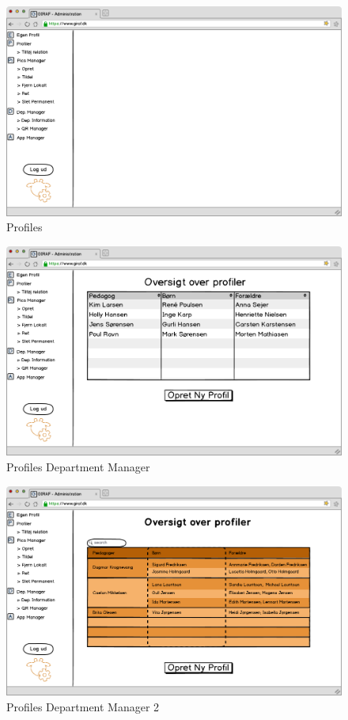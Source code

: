 \begin{figure}[p]
\centering
\includegraphics[width=1\textwidth]{images/mockup/profiler.png}
\caption{Profiles}
\label{fig:profiles}
\end{figure}

\newpage

\begin{figure}[p]
\centering
\includegraphics[width=1\textwidth]{images/mockup/profilerDeptManager.png}
\caption{Profiles Department Manager}
\label{fig:profiles_dept_manager}
\end{figure}

\begin{figure}[p]
\centering
\includegraphics[width=1\textwidth]{images/mockup/profilerDeptManager1.png}
\caption{Profiles Department Manager 2}
\label{fig:profiles_dept_manager2}
\end{figure}

